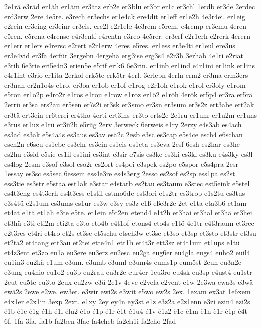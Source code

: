 {2e1rä
e3räd
er1äh
er1äm
er3ätz
erb2e
er3blu
er3br
er1c
er3chl
1erdb
er3de
2erdec
erd3erw
2ere
4e5re.
e3rech
er3echs
er1e4ck
ere4dit
er1eff
er1e2h
4e3r4ei.
er1eig
e2rein
er3eing
er3einr
er3eis.
ere2l
e2r1ele
4e3rem
e5rem.
e4remp
er3emu
4eren
e5ren.
e5rena
e4rense
e4r3entf
e4rentn
e3reo
4e5rer.
er3erf
e2r1erh
e2rerk
4erern
er1err
er1ers
e4rersc
e2rert
e2r1erw
4eres
e5res.
er1ess
er3e4ti
er1eul
ere3us
er3e4vid
er3fä
4erfür
3ergebn
4ergehä
erg3ise
erg3s4
e2r3h
3erhab
4e1ri
e2riat
e3rib
6e3rie
eri5e4n3
erien5e
e5rif
erik6
6e3rin.
er1inb
er1ind
e4r1ini
er1ink
er1ins
e4r1int
e3rio
er1ita
2erkol
erk5te
erk5tr
4erl.
3erlebn
4erln
erm2
er3ma
erm3ers
er3nan
er2n1o4s
e1ro.
er3oa
er1ob
er1of
e1rog
e2r1oh
e1rok
e1rol
er3oly
e1rom
e5ron
er1o2p
e4ro2r
e1ros
e1rou
e1row
e1roz
er1ö2
e1röh
4erök
er5p4
er3ra
er5rä
2errü
er3sa
ers2au
er5sen
er7s2i
er3sk
er3smo
er3sn
er3sum
er3s2z
ert3abe
ert2ak
er3tä
ert3ein
er6terei
er4tho
4erti
ert3ins
er3to
erts2e
2e1ru
er1uhr
er1u2m
er1uns
e3rus
er1uz
e1rü
er3ü2b
e5rüg
2erv
3erweck
6erweis
e1ry
2erzy
e4s3ab
es4ach
es3ad
es3ak
e5s4a4s
es3aus
es3av
esä2c
2esb
e3sc
es3cap
e5s4ce
esch4
e6schan
esch2n
e6scu
es1ebe
es3ehr
es3ein
es1eis
es1eta
es3eva
2esf
6esh
es2har
es3he
es2hu
e3sid
e5sie
es1il
es1ini
es3int
e3sir
e7sis
es3ke
es3ki
es3kl
es3ku
e4s3ky
es3l
es4log
2esm
e3sof
e3sol
eso2r
es2ort
es4pei
e3spek
es2po
e5spor
e5s4pra
2esr
1essay
es3sc
es5sec
6essem
ess4e3re
es4s3erg
2esso
es2sof
es2sp
ess1pa
es2st
ess3tie
es3str
e5staa
est1ak
e3star
e4starb
es2tau
es3taum
e3stec
est5eink
e5stel
es4t3eng
es4t3erh
es4t3ess
e1stil
estmo6de
est3ori
e1s2tr
es3trop
e1s2tu
es3tus
e3s4tü
e2s1um
es3ums
es1ur
es3w
e3sy
es3z
e1ß
eße3r2e
2et
e1ta
eta3b6
et1am
et4at
e1tä
et1äh
e3te
e5te.
et1ein
e5t2en
etend4
e1t2h
et3hai
et3hal
et3hä
et3hei
et3hü
e3ti
eti2m
eti2ta
e3to
eto4b
e4t1of
etons4
eto4s
e1tö
4e1tr
e4t3raum
et3rec
e2t3res
et4ri
et4ro
et2s
et3sc
et5schu
etsch3w
et3se
et3so
et3sp
et3sto
et3str
et3su
et2ta2
et4tang
ett3au
et2tei
ette4n1
ett1h
et4t3r
ett3sz
et4t1um
et1ups
e1tü
et4z3ent
et3zo
eu1a
eu3ere
eu3erz
eu2esc
eu2ga
eug6er
eu4gla
eugs4
euho2
euil4
eu1in3
eu2kä
e1um
e3um.
e3umb
e3uml
e3um4s
eums1p
eum5st
2eun
eu3n2e
e3ung
eu4nio
eu1o2
eu3p
eu2rau
eu3r2e
eur4er
1eu3ro
eu4sk
eu3sp
e4ust4
eu1str
2eut
eu5te
eu3to
2eux
eu2zw
e3ü
2e1v
4eve
e2vela
e2vent
e1w
2e3wa
ewa3s
e3wä
ewä2s
2ewe
e2we.
ew3et.
e3wir
ewi2s
e3wit
e5wo
ew2s
2ex.
1exam
ex3at
1e6xem
e4x1er
e2x1in
3exp
2ext.
e1xy
2ey
ey4n
ey3st
e1z
e3z2a
e2z1enn
e3zi
ezin4
ezi2s
é1b
é1c
é1g
é1h
é1l
élu2
é1o
é1p
é1r
é1t
é1u4
é1v
é1z2
è1c
è1m
è1n
è1r
ê1p
ê4t
6f.
1fa
3fa.
fa1b
fa2ben
3fac
fa4cheb
fa2ch1i
fa2cho
2fad
}
